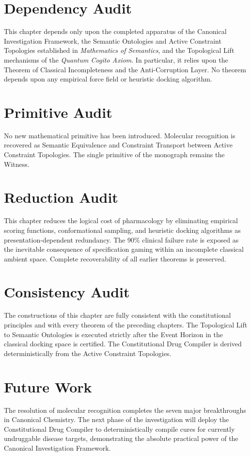 \documentclass[11pt,openany]{extbook}
\newenvironment{dependencyaudit}{\section*{Dependency Audit}}{}
\newenvironment{primitiveaudit}{\section*{Primitive Audit}}{}
\newenvironment{reductionaudit}{\section*{Reduction Audit}}{}
\newenvironment{consistencyaudit}{\section*{Consistency Audit}}{}
\newenvironment{futurework}{\section*{Future Work}}{}
\theoremstyle{plain}
\theoremstyle{definition}
\begin{document}
\begin{dependencyaudit}
\noindent This chapter depends only upon the completed apparatus of the Canonical Investigation Framework, the Semantic Ontologies and Active Constraint Topologies established in \textit{Mathematics of Semantics}, and the Topological Lift mechanisms of the \textit{Quantum Cogito Axiom}. In particular, it relies upon the Theorem of Classical Incompleteness and the Anti-Corruption Layer. No theorem depends upon any empirical force field or heuristic docking algorithm.
\end{dependencyaudit}

\begin{primitiveaudit}
\noindent No new mathematical primitive has been introduced. Molecular recognition is recovered as Semantic Equivalence and Constraint Transport between Active Constraint Topologies. The single primitive of the monograph remains the Witness.
\end{primitiveaudit}

\begin{reductionaudit}
\noindent This chapter reduces the logical cost of pharmacology by eliminating empirical scoring functions, conformational sampling, and heuristic docking algorithms as presentation-dependent redundancy. The 90\% clinical failure rate is exposed as the inevitable consequence of specification gaming within an incomplete classical ambient space. Complete recoverability of all earlier theorems is preserved.
\end{reductionaudit}

\begin{consistencyaudit}
\noindent The constructions of this chapter are fully consistent with the constitutional principles and with every theorem of the preceding chapters. The Topological Lift to Semantic Ontologies is executed strictly after the Event Horizon in the classical docking space is certified. The Constitutional Drug Compiler is derived deterministically from the Active Constraint Topologies.
\end{consistencyaudit}

\begin{futurework}
\noindent The resolution of molecular recognition completes the seven major breakthroughs in Canonical Chemistry. The next phase of the investigation will deploy the Constitutional Drug Compiler to deterministically compile cures for currently undruggable disease targets, demonstrating the absolute practical power of the Canonical Investigation Framework.
\end{futurework}
\end{document}

